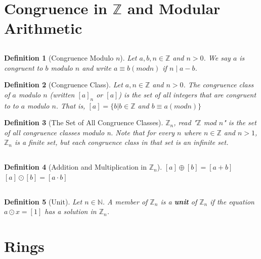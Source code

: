 \documentclass{article}
\theoremstyle{break}
\newtheorem{definition}{Definition}[subsection]
\newcommand*{\Z}{\mathbb{Z}}
\newcommand*{\N}{\mathbb{N}}
\begin{document}
\section{Congruence in $\Z$ and Modular Arithmetic}
\subsection{}
\begin{definition}[Congruence Modulo $n$]
  Let $a, b, n \in \Z$ and $n > 0$. We say $a$ is congruent to $b$ modulo $n$
  and write $a \equiv b (mod n)$ if $n \mid a - b$.
\end{definition}

\begin{definition}[Congruence Class]
  Let $a, n \in \Z$ and $n > 0$. The congruence class of $a$ modulo $n$
  (written $[a]_n$ or $[a]$) is the set of all integers that are congruent to
  to $a$ modulo $n$. That is, $[a] = \{b | b \in \Z$ and $b \equiv a (mod n)\}$
\end{definition}

\begin{definition}[The Set of All Congruence Classes] 
  $\Z_n$, read "$\Z$ mod $n$" is the set of all congruence classes modulo n.
  Note that for every $n$ where $n \in \Z$ and $n > 1$, $\Z_n$ is a finite set,
  but each congruence class in that set is an infinite set. 
\end{definition}

\subsection{}
\begin{definition}[Addition and Multiplication in $\Z_n$]
  $[a] \oplus [b] = [a + b]$
  \\$[a] \odot [b] = [a \cdot b]$
\end{definition}

\subsection{}
\begin{definition}[Unit]
  Let $n \in \N$. A member of $\Z_n$ is a \textbf{unit} of $\Z_n$ if the
  equation $a \odot x = [1]$ has a solution in $\Z_n$.
\end{definition}

\pagebreak
\section{Rings}
\end{document}
